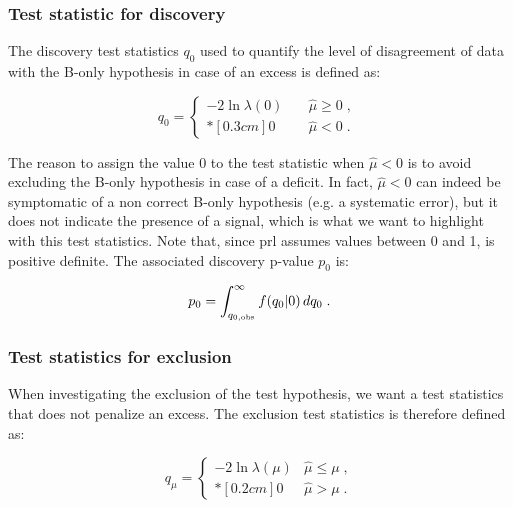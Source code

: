 \subsubsection*{Test statistic for discovery}

The discovery test statistics $q_{0}$ used to quantify the level of disagreement of data with the B-only hypothesis in case of an excess is defined as:

\begin{equation}
\label{eq:stat:q0}
q_{0} =
\left\{ \! \! \begin{array}{ll}
               - 2 \ln \lambda(0)
               & \quad \hat{\mu} \ge 0 \;, \\*[0.3 cm]
               0 & \quad \hat{\mu} < 0  \;.
              \end{array} \; \right.
\end{equation}
 
\noindent The reason to assign the value 0 to the test statistic when $\hat{\mu} < 0$ is to avoid excluding the B-only hypothesis in case of a deficit. In fact, $\hat{\mu} < 0$ can indeed be symptomatic of a non correct B-only hypothesis (e.g. a systematic error), but it does not indicate the presence of a signal, which is what we want to highlight with this test statistics. Note that, since \gls{prl} assumes values between 0 and 1, \qzero is positive definite. The associated discovery p-value $p_{0}$ is:

\begin{equation}
\label{eq:stat:p0}
p_{0} = \int_{q_{0,{\rm obs}}}^{\infty} f(q_{0} | 0 ) \, d q_{0} \; .
\end{equation}

\subsubsection*{Test statistics for exclusion}

When investigating the exclusion of the test hypothesis, we want a test statistics that does not penalize an excess. The exclusion test statistics \qmu is therefore defined as:

\begin{equation}
\label{eq:stat:qmu}
q_{\mu} =
\left\{ \! \! \begin{array}{ll}
               - 2 \ln \lambda(\mu)  & \hat{\mu} \le \mu  \;, \\*[0.2 cm]
               0 & \hat{\mu} > \mu \;.
              \end{array}
       \right.
\end{equation}

